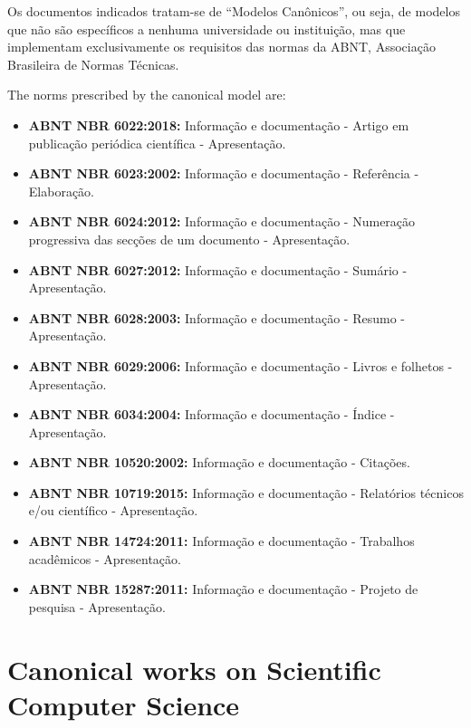 \documentclass[
12pt,				%
openright,			%
oneside,			%
a4paper,			%
brazil,				%
english,			%
]{abntex2}
\begin{document}
\begin{citacao}
  Os documentos indicados tratam-se de “Modelos Canônicos”, ou seja,
  de modelos que não são específicos a nenhuma universidade ou instituição, mas
  que implementam exclusivamente os requisitos das normas da ABNT, Associação
  Brasileira de Normas Técnicas. \cite[Cap. 1]{araujoclasse}
\end{citacao}


The norms prescribed by the canonical model are:

\begin{itemize}
\item \textbf{ABNT NBR 6022:2018:} Informação e documentação -
  Artigo em publicação periódica científica - Apresentação.
\item \textbf{ABNT NBR 6023:2002:} Informação e documentação -
  Referência - Elaboração.
\item \textbf{ABNT NBR 6024:2012:} Informação e documentação -
  Numeração progressiva das secções de um documento - Apresentação.
\item \textbf{ABNT NBR 6027:2012:} Informação e documentação -
  Sumário - Apresentação.
\item \textbf{ABNT NBR 6028:2003:} Informação e documentação -
  Resumo - Apresentação.
\item \textbf{ABNT NBR 6029:2006:} Informação e documentação -
  Livros e folhetos - Apresentação.
\item \textbf{ABNT NBR 6034:2004:} Informação e documentação -
  Índice - Apresentação.
\item \textbf{ABNT NBR 10520:2002:} Informação e documentação -
  Citações.
\item \textbf{ABNT NBR 10719:2015:} Informação e documentação -
  Relatórios técnicos e/ou científico - Apresentação.
\item \textbf{ABNT NBR 14724:2011:} Informação e documentação -
  Trabalhos acadêmicos - Apresentação.
\item \textbf{ABNT NBR 15287:2011:} Informação e documentação -
  Projeto de pesquisa - Apresentação.
\end{itemize}

\section{Canonical works on Scientific Computer Science}
\label{sec:scim}
\end{document}
